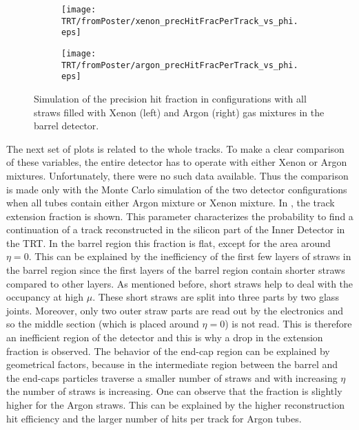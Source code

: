 \begin{figure}[h]

\begin{subfigure}{.5\textwidth}
  \centering
  \texttt{[image: TRT/fromPoster/xenon\_precHitFracPerTrack\_vs\_phi.eps]}
\end{subfigure}%
\begin{subfigure}{.5\textwidth}
  \centering
  \texttt{[image: TRT/fromPoster/argon\_precHitFracPerTrack\_vs\_phi.eps]}
\end{subfigure}

\caption{Simulation of the precision hit fraction in configurations with all straws filled with Xenon (left) and Argon (right) gas mixtures in the barrel detector.}
  \label{fig:precHitFracPerTrack}
\end{figure}

The next set of plots is related to the whole tracks. To make a clear comparison of these variables, the entire detector has to operate with either Xenon or Argon mixtures.
Unfortunately, there were no such data available. Thus the comparison is made only with the Monte Carlo simulation of the two detector configurations when all tubes contain either Argon mixture or Xenon mixture. In , the track extension fraction is shown. This parameter characterizes
the probability to find a continuation of a track reconstructed in the silicon part of the Inner Detector in the TRT.
In the barrel region this fraction is flat, except for the area around $\eta = 0$. This can be explained by the inefficiency of the first few layers of straws in the barrel region
since the first layers of the barrel region contain shorter straws compared to other layers. 
As mentioned before, short straws help to deal with the occupancy at high $\mu$.
These short straws are split into three parts by two glass joints. Moreover, only two outer straw parts are read out by the electronics and so the middle section (which is placed around $\eta=0$) is not read. This is therefore an inefficient region of the detector and this is why a drop in the extension fraction is observed.
The behavior of the end-cap region can be explained by geometrical factors, because in the intermediate region between the barrel and the end-caps particles
traverse a smaller number of straws and with increasing $\eta$ the number of straws is increasing.
One can observe that the fraction is slightly higher for the Argon straws. This can be explained by the higher reconstruction hit efficiency and the larger number of hits per
track for Argon tubes.

